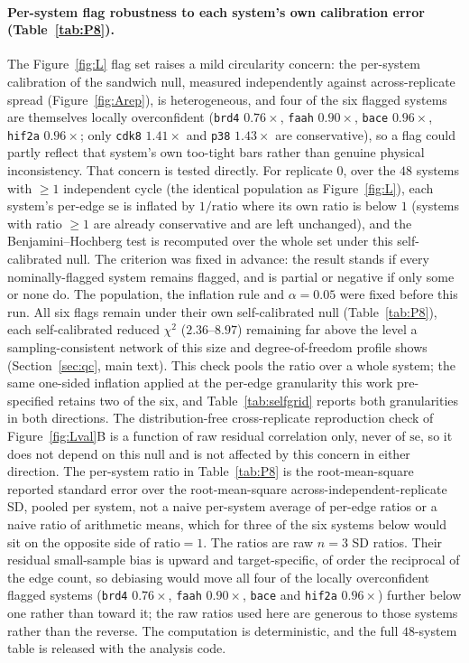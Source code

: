 \paragraph{Per-system flag robustness to each system's own calibration error (Table~\ref{tab:P8}).}
The Figure~\ref{fig:L} flag set raises a mild circularity concern: the per-system calibration of
the sandwich null, measured independently against across-replicate spread
(Figure~\ref{fig:Arep}), is heterogeneous, and four of the six flagged systems are themselves
locally overconfident (\texttt{brd4} $0.76\times$, \texttt{faah} $0.90\times$, \texttt{bace}
$0.96\times$, \texttt{hif2a} $0.96\times$; only \texttt{cdk8} $1.41\times$ and \texttt{p38}
$1.43\times$ are conservative), so a flag could partly reflect that system's own too-tight bars
rather than genuine physical inconsistency. That concern is tested directly. For replicate $0$, over the $48$
systems with $\geq1$ independent cycle (the identical population as Figure~\ref{fig:L}), each
system's per-edge $\mathrm{se}$ is inflated by $1/\mathrm{ratio}$ where its own ratio is below
$1$ (systems with ratio $\geq1$ are already conservative and are left unchanged), and the
Benjamini--Hochberg test is recomputed over the whole set under this self-calibrated null.
The criterion was fixed in advance: the result stands if every nominally-flagged system remains flagged, and is partial or negative if only some or none do. The population, the inflation rule and $\alpha=0.05$ were fixed
before this run. All six flags remain under their own self-calibrated null (Table~\ref{tab:P8}), each self-calibrated reduced $\chi^2$
($2.36$--$8.97$) remaining far above the level a sampling-consistent network of this size and
degree-of-freedom profile shows (Section~\ref{sec:qc}, main text). This check pools the ratio over
a whole system; the same one-sided inflation applied at the per-edge granularity this work
pre-specified retains two of the six, and Table~\ref{tab:selfgrid} reports both granularities in
both directions. The distribution-free
cross-replicate reproduction check of Figure~\ref{fig:Lval}B is a function of raw residual
correlation only, never of $\mathrm{se}$, so it does not depend on this null and is not affected
by this concern in either direction. The per-system ratio in Table~\ref{tab:P8} is the
root-mean-square reported standard error over the root-mean-square across-independent-replicate
SD, pooled per system, not a naive per-system average of per-edge ratios or a naive ratio of
arithmetic means, which for three of the six systems below would sit on the opposite side of
$\mathrm{ratio}=1$. The ratios are raw $n{=}3$ SD ratios. Their residual small-sample bias is
upward and target-specific, of order the reciprocal of the edge count, so debiasing would move all
four of the locally overconfident flagged systems (\texttt{brd4} $0.76\times$, \texttt{faah}
$0.90\times$, \texttt{bace} and \texttt{hif2a} $0.96\times$) further below one rather than toward
it; the raw ratios used here are generous to those systems rather than the reverse. The computation
is deterministic, and the full $48$-system table is released with the analysis code.

